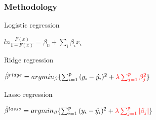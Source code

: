\documentclass[xcolor={x11names,svgnames,dvipsnames}]{beamer}
\begin{document}
\begin{frame}
\frametitle{Methodology}
%
\begin{block}{Logistic regression}
\begin{center}
$ln{\frac{F(x)}{1-F(x)}}=\beta_0+\sum_i\beta_ix_i$\\
\end{center}
\end{block}

\begin{block}{Ridge regression}
\begin{center}
$\hat{\beta}^{ridge}=argmin_{\beta}\{\sum_{i=1}^p{(y_i-\hat{y_i})^2}+{\color{red}\lambda \sum_{j=1}^p\beta_j^2}\}$
\\
\end{center}
\end{block}

\begin{block}{Lasso regression}
\begin{center}
$\hat{\beta}^{lasso}=argmin_{\beta}\{\sum_{i=1}^p{(y_i-\hat{y_i})^2}+{\color{red}\lambda\sum_{j=1}^p |\beta_j|}\}$\\
\end{center}
\end{block}

\end{frame}
\end{document}
